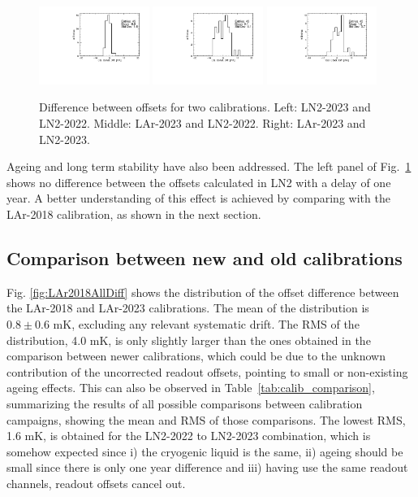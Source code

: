 \begin{figure}[htbp]
\centering
{\includegraphics[width=0.32\textwidth]{images/figure_21_a.pdf}}
{\includegraphics[width=0.32\textwidth]{images/figure_21_b.pdf}}
{\includegraphics[width=0.32\textwidth]{images/figure_21_c.pdf}}
\caption{Difference between offsets for two calibrations. Left: LN2-2023 and LN2-2022. Middle: LAr-2023 and LN2-2022. Right:  LAr-2023 and LN2-2023.}
\label{fig:comp_newCalib}
\end{figure}

Ageing and long term stability have also been addressed. The left panel of Fig.~\ref{fig:comp_newCalib} shows no difference between the offsets calculated in LN2 with a delay of one year. A better understanding of this effect is achieved by comparing with the LAr-2018 calibration, as shown in the next section.

\subsection{Comparison between new and old calibrations}
\label{sec:compNewOld}

\noindent Fig. \ref{fig:LAr2018AllDiff} shows the distribution of the offset difference between the LAr-2018 and LAr-2023 calibrations. The mean of the distribution is $0.8\pm0.6$ mK, excluding any relevant systematic drift. The RMS of the distribution, 4.0 mK, is only slightly larger than the ones obtained in the comparison between newer calibrations, which could be due to the unknown contribution of the uncorrected readout offsets, pointing to small or non-existing ageing effects. This can also be observed in Table~\ref{tab:calib_comparison}, summarizing the results of all possible comparisons between calibration campaigns, showing the mean and RMS of those comparisons. The lowest RMS, 1.6 mK, is obtained for the LN2-2022 to LN2-2023 combination, which is somehow expected since i) the cryogenic liquid is the same, ii) ageing should be small since there is only one year difference and iii) having use the same readout channels, readout offsets cancel out.

